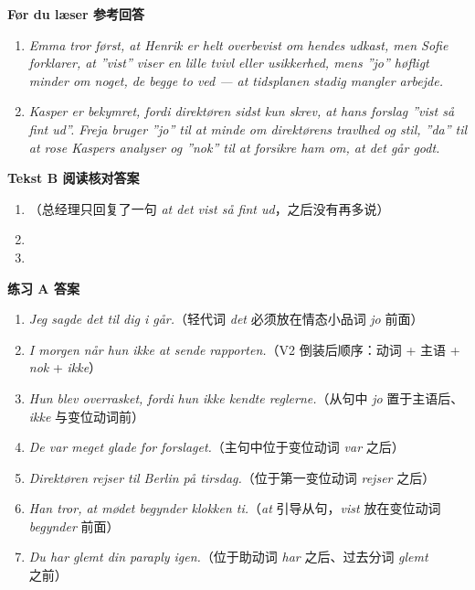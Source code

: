 \begin{answerbox}
\textbf{Før du læser 参考回答}
\begin{enumerate}
  \item \textit{Emma tror først, at Henrik er helt overbevist om hendes udkast, men Sofie forklarer, at ”vist” viser en lille tvivl eller usikkerhed, mens ”jo” høfligt minder om noget, de begge to ved --- at tidsplanen stadig mangler arbejde.}
  \item \textit{Kasper er bekymret, fordi direktøren sidst kun skrev, at hans forslag ”vist så fint ud”. Freja bruger ”jo” til at minde om direktørens travlhed og stil, ”da” til at rose Kaspers analyser og ”nok” til at forsikre ham om, at det går godt.}
\end{enumerate}

\textbf{Tekst B 阅读核对答案}
\begin{enumerate}
  \item {}（总经理只回复了一句 \textit{at det vist så fint ud}，之后没有再多说）
  \item {}
  \item {}
\end{enumerate}

\textbf{练习 A 答案}
\begin{enumerate}
  \item \textit{Jeg sagde det  til dig i går.}（轻代词 \textit{det} 必须放在情态小品词 \textit{jo} 前面）
  \item \textit{I morgen når hun  ikke at sende rapporten.}（V2 倒装后顺序：动词 + 主语 + \textit{nok} + \textit{ikke}）
  \item \textit{Hun blev overrasket, fordi hun  ikke kendte reglerne.}（从句中 \textit{jo} 置于主语后、\textit{ikke} 与变位动词前）
  \item \textit{De var  meget glade for forslaget.}（主句中位于变位动词 \textit{var} 之后）
  \item \textit{Direktøren rejser  til Berlin på tirsdag.}（位于第一变位动词 \textit{rejser} 之后）
  \item \textit{Han tror, at mødet  begynder klokken ti.}（\textit{at} 引导从句，\textit{vist} 放在变位动词 \textit{begynder} 前面）
  \item \textit{Du har  glemt din paraply igen.}（位于助动词 \textit{har} 之后、过去分词 \textit{glemt} 之前）
\end{enumerate}


\end{answerbox}
